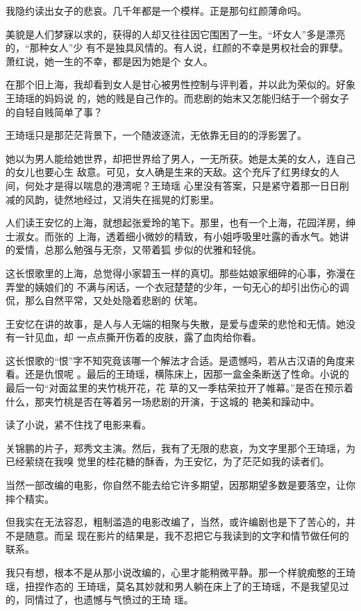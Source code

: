 \documentclass[12pt,a4paper]{article}
\begin{document}
		我隐约读出女子的悲哀。几千年都是一个模样。正是那句红颜薄命吗。

		美貌是人们梦寐以求的，获得的人却又往往因它围困了一生。“坏女人”多是漂亮的，“那种女人”少
	有不是独具风情的。有人说，红颜的不幸是男权社会的罪孽。萧红说，她一生的不幸，都是因为她是个
	女人。

		在那个旧上海，我却看到女人是甘心被男性控制与评判着，并以此为荣似的。好象王琦瑶的妈妈说
	的，她的贱是自己作的。而悲剧的始末又怎能归结于一个弱女子的自轻自贱简单了事？

		王琦瑶只是那茫茫背景下，一个随波逐流，无依靠无目的的浮影罢了。

		她以为男人能给她世界，却把世界给了男人，一无所获。她是太美的女人，连自己的女儿也要心生
	敌意。可见，女人确是生来的天敌。这个充斥了红男绿女的人间，何处才是得以喘息的港湾呢？王琦瑶
	心里没有答案，只是紧守着那一日日削减的风韵，徒然地经过，又消失在摇晃的灯影里。

		人们读王安忆的上海，就想起张爱玲的笔下。那里，也有一个上海，花园洋房，绅士淑女。而张的
	上海，透着细小微妙的精致，有小姐呼吸里吐露的香水气。她讲的爱情，总那么勉强与无奈，又带着狐
	步似的优雅和轻佻。

		这长恨歌里的上海，总觉得小家碧玉一样的真切。那些姑娘家细碎的心事，弥漫在弄堂的姨娘们的
	不满与闲话，一个衣冠楚楚的少年，一句无心的却引出伤心的调侃，那么自然平常，又处处隐着悲剧的
	伏笔。

		王安忆在讲的故事，是人与人无端的相聚与失散，是爱与虚荣的悲怆和无情。她没有一针见血，却
	一点点撕开伤着的皮肤，露了血肉给你看。

		这长恨歌的“恨”字不知究竟该哪一个解法才合适。是遗憾吗，若从古汉语的角度来看。还是仇恨呢
	。最后的王琦瑶，横陈床上，因那一盒金条断送了性命。小说的最后一句“对面盆里的夹竹桃开花，花
	草的又一季枯荣拉开了帷幕。”是否在预示着什么，那夹竹桃是否在等着另一场悲剧的开演，于这城的
	艳美和躁动中。

		读了小说，紧不住找了电影来看。

		关锦鹏的片子，郑秀文主演。然后，我有了无限的悲哀，为文字里那个王琦瑶，为已经萦绕在我嗅
	觉里的桂花糖的酥香，为王安忆，为了茫茫如我的读者们。

		当然一部改编的电影，你自然不能去给它许多期望，因那期望多数是要落空，让你摔个精实。

		但我实在无法容忍，粗制滥造的电影改编了，当然，或许编剧也是下了苦心的，并不是随意。而呈
	现在影片的结果是，我不忍把它与我读到的文字和情节做任何的联系。

		我只有想，根本不是从那小说改编的，心里才能稍微平静。那一个样貌痴憨的王琦瑶，扭捏作态的
	王琦瑶，莫名其妙就和男人躺在床上了的王琦瑶，不是我望见过的，同情过了，也遗憾与气愤过的王琦
	瑶。
\end{document}
